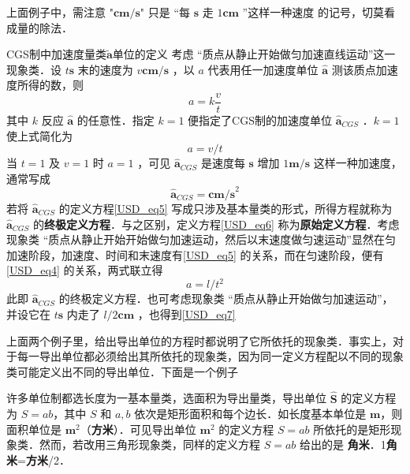 上面例子中，需注意 "$\boldsymbol{cm/s}$" 只是 “每 $\boldsymbol{s}$ 走 $1\boldsymbol{cm}$ ”这样一种速度 的记号，切莫看成量的除法．
\begin{example}{CGS制中加速度量类$\tilde{\boldsymbol{a}}$单位的定义}\label{USD_ex2}
考虑 “质点从静止开始做匀加速直线运动”这一现象类．设 $t\boldsymbol{s}$ 末的速度为 $v\boldsymbol{cm/s}$ ，以 $a$ 代表用任一加速度单位 $\hat{\boldsymbol{a}}$ 测该质点加速度所得的数，则
\begin{equation}\label{USD_eq6}
a=k\frac{v}{t}
\end{equation}
其中 $k$ 反应 $\hat{\boldsymbol{a}}$ 的任意性．指定 $k=1$ 便指定了CGS制的加速度单位 $\hat{\boldsymbol{a}}_{CGS}$ ．$k=1$ 使上式简化为
\begin{equation}\label{USD_eq5}
a=v/t
\end{equation}
当 $t=1$ 及 $v=1$ 时 $a=1$ ，可见 $\hat{\boldsymbol{a}}_{CGS}$ 是速度每 $\boldsymbol{s}$ 增加 $1\boldsymbol{m/s}$ 这样一种加速度，通常写成
\begin{equation}
\hat{\boldsymbol{a}}_{CGS}=\boldsymbol{cm/s}^2
\end{equation}
若将 $\hat{\boldsymbol{a}}_{CGS}$ 的定义方程\autoref{USD_eq5} 写成只涉及基本量类的形式，所得方程就称为  $\hat{\boldsymbol{a}}_{CGS}$ 的\textbf{终极定义方程}．与之区别，定义方程\autoref{USD_eq6} 称为\textbf{原始定义方程}．考虑现象类 “质点从静止开始开始做匀加速运动，然后以末速度做匀速运动”显然在匀加速阶段，加速度、时间和末速度有\autoref{USD_eq5} 的关系，而在匀速阶段，便有\autoref{USD_eq4} 的关系，两式联立得
\begin{equation}\label{USD_eq7}
a=l/t^2
\end{equation}
此即 $\hat{\boldsymbol{a}}_{CGS}$ 的终极定义方程．也可考虑现象类 “质点从静止开始做匀加速运动”，并设它在 $t\boldsymbol{s}$ 内走了 $l/2\boldsymbol{cm}$ ，也得到\autoref{USD_eq7} 
\end{example}
上面两个例子里，给出导出单位的方程时都说明了它所依托的现象类．事实上，对于每一导出单位都必须给出其所依托的现象类，因为同一定义方程配以不同的现象类可能定义出不同的导出单位．下面是一个例子
\begin{example}{}
许多单位制都选长度为一基本量类，选面积为导出量类，导出单位 $\hat{\boldsymbol{S}}$ 的定义方程为 $S=ab$，其中 $S$ 和 $a,b$ 依次是矩形面积和每个边长．如长度基本单位是 $\boldsymbol{m}$，则面积单位是 $\boldsymbol{m}^2$（\textbf{方米}）．可见导出单位 $\boldsymbol{m}^2$ 的定义方程 $S=ab$ 所依托的是矩形现象类．然而，若改用三角形现象类，同样的定义方程 $S=ab$ 给出的是 \textbf{角米}．1\textbf{角米}=\textbf{方米}/2．
\end{example}
